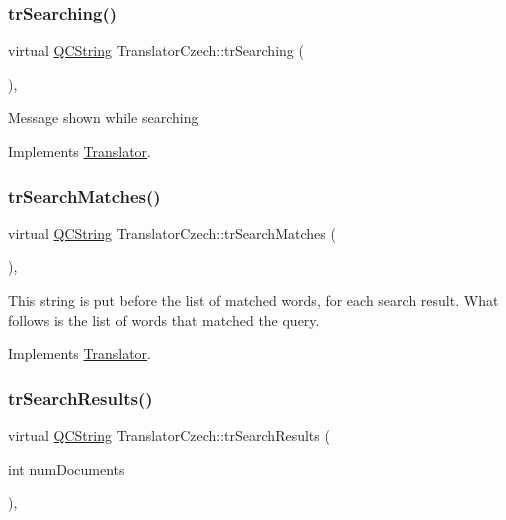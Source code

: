 \subsubsection{\texorpdfstring{trSearching()}{trSearching()}}
{\footnotesize\ttfamily virtual \mbox{\hyperlink{class_q_c_string}{Q\+C\+String}} Translator\+Czech\+::tr\+Searching (\begin{DoxyParamCaption}{ }\end{DoxyParamCaption})\hspace{0.3cm}{\ttfamily [inline]}, {\ttfamily [virtual]}}

Message shown while searching 

Implements \mbox{\hyperlink{class_translator}{Translator}}.

\mbox{\label{class_translator_czech_ae7016606545b5c6ca5437aa4fd1c87f5}} 
\subsubsection{\texorpdfstring{trSearchMatches()}{trSearchMatches()}}
{\footnotesize\ttfamily virtual \mbox{\hyperlink{class_q_c_string}{Q\+C\+String}} Translator\+Czech\+::tr\+Search\+Matches (\begin{DoxyParamCaption}{ }\end{DoxyParamCaption})\hspace{0.3cm}{\ttfamily [inline]}, {\ttfamily [virtual]}}

This string is put before the list of matched words, for each search result. What follows is the list of words that matched the query. 

Implements \mbox{\hyperlink{class_translator}{Translator}}.

\mbox{\label{class_translator_czech_a60aa91665044c59bb7124454ebc03af3}} 
\subsubsection{\texorpdfstring{trSearchResults()}{trSearchResults()}}
{\footnotesize\ttfamily virtual \mbox{\hyperlink{class_q_c_string}{Q\+C\+String}} Translator\+Czech\+::tr\+Search\+Results (\begin{DoxyParamCaption}\item[{int}]{num\+Documents }\end{DoxyParamCaption})\hspace{0.3cm}{\ttfamily [inline]}, {\ttfamily [virtual]}}

